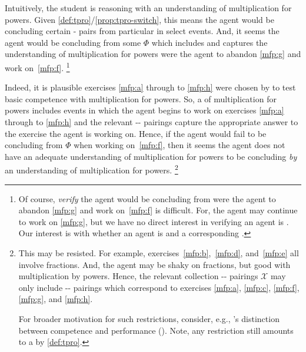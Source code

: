\begin{note}
  \noindent%
  Intuitively, the student is reasoning with an understanding of multiplication for powers.
  Given \autoref{def:tpro}/\autoref{prop:tpro-switch}, this means the agent would be concluding certain - pairs from particular  in select events.
  And, it seems the agent would be concluding  from some \pool{} \(\Phi\) which includes  and captures the \agents{} understanding of multiplication for powers were the agent to abandon \ref{mfp:g} and work on~\ref{mfp:f}.%
  \footnote{
    Of course, \emph{verify} the agent would be concluding  from  were the agent to abandon \ref{mfp:g} and work on~\ref{mfp:f} is difficult.
  For, the agent may continue to work on \ref{mfp:g}, but we have no direct interest in verifying an agent is \tCV{}.
  Our interest is with whether an agent is \tCV{} and a corresponding \tpro{}.
  }

  Indeed, it is plausible exercises \ref{mfp:a} through to \ref{mfp:h} were chosen by \citeauthor{Gelfand:1993aa} to test basic competence with multiplication for powers.
  So, a \tpro{} \tproS{} of multiplication for powers includes events in which the agent begins to work on exercises \ref{mfp:a} through to \ref{mfp:h} and the relevant -- pairings capture the appropriate answer to the exercise the agent is working on.
  Hence, if the agent would fail to be concluding  from \(\Phi\) when working on~\ref{mfp:f}, then it seems the agent does not have an adequate understanding of multiplication for powers to be concluding \emph{by} an understanding of multiplication for powers.%
  \footnote{
    This may be resisted.
    For example, exercises~\ref{mfp:b},~\ref{mfp:d}, and~\ref{mfp:e} all involve fractions.
    And, the agent may be shaky on fractions, but good with multiplication by powers.
    Hence, the relevant collection -- pairings \(\mathcal{X}\) may only include -- pairings which correspond to exercises \ref{mfp:a},  \ref{mfp:c},  \ref{mfp:f},  \ref{mfp:g}, and \ref{mfp:h}.

    For broader motivation for such restrictions, consider, e.g., \citeauthor{Chomsky:2015aa}'s distinction between competence and performance    (\citeyear[xii]{Chomsky:2015aa}).
    Note, any restriction still amounts to a \tpro{} by \autoref{def:tpro}.
  }
\end{note}



